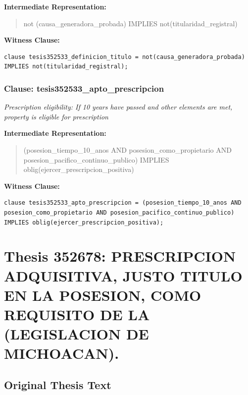 \documentclass[11pt,a4paper]{article}
\begin{document}
\textbf{Intermediate Representation:}

\begin{quote}
not (causa\_generadora\_probada) IMPLIES not(titularidad\_registral)
\end{quote}

\textbf{Witness Clause:}

\begin{lstlisting}[style=witnessstyle, language=Witness]
clause tesis352533_definicion_titulo = not(causa_generadora_probada) IMPLIES not(titularidad_registral);
\end{lstlisting}

\subsubsection{Clause: tesis352533\_apto\_prescripcion}

\textit{Prescription eligibility: If 10 years have passed and other elements are met, property is eligible for prescription}

\textbf{Intermediate Representation:}

\begin{quote}
(posesion\_tiempo\_10\_anos AND posesion\_como\_propietario AND posesion\_pacifico\_continuo\_publico) IMPLIES oblig(ejercer\_prescripcion\_positiva)
\end{quote}

\textbf{Witness Clause:}

\begin{lstlisting}[style=witnessstyle, language=Witness]
clause tesis352533_apto_prescripcion = (posesion_tiempo_10_anos AND posesion_como_propietario AND posesion_pacifico_continuo_publico) IMPLIES oblig(ejercer_prescripcion_positiva);
\end{lstlisting}

\newpage

\section{Thesis 352678: PRESCRIPCION ADQUISITIVA, JUSTO TITULO EN LA POSESION, COMO REQUISITO DE LA (LEGISLACION DE MICHOACAN).}
\label{thesis:352678}

\subsection{Original Thesis Text}
\end{document}

